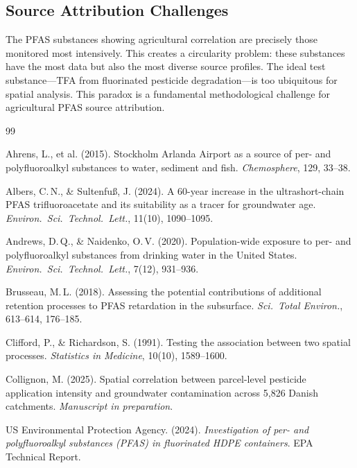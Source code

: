 \documentclass[12pt,a4paper]{article}
\begin{document}
\subsection{Source Attribution Challenges}

The PFAS substances showing agricultural correlation are precisely those monitored most intensively. This creates a circularity problem: these substances have the most data but also the most diverse source profiles. The ideal test substance---TFA from fluorinated pesticide degradation---is too ubiquitous for spatial analysis. This paradox is a fundamental methodological challenge for agricultural PFAS source attribution.

\begin{thebibliography}{99}

 Ahrens, L., et al. (2015). Stockholm Arlanda Airport as a source of per- and polyfluoroalkyl substances to water, sediment and fish. \textit{Chemosphere}, 129, 33--38.

 Albers, C.\,N., \& Sultenfu\ss, J. (2024). A 60-year increase in the ultrashort-chain PFAS trifluoroacetate and its suitability as a tracer for groundwater age. \textit{Environ.\ Sci.\ Technol.\ Lett.}, 11(10), 1090--1095.

 Andrews, D.\,Q., \& Naidenko, O.\,V. (2020). Population-wide exposure to per- and polyfluoroalkyl substances from drinking water in the United States. \textit{Environ.\ Sci.\ Technol.\ Lett.}, 7(12), 931--936.

 Brusseau, M.\,L. (2018). Assessing the potential contributions of additional retention processes to PFAS retardation in the subsurface. \textit{Sci.\ Total Environ.}, 613--614, 176--185.

 Clifford, P., \& Richardson, S. (1991). Testing the association between two spatial processes. \textit{Statistics in Medicine}, 10(10), 1589--1600.

 Collignon, M. (2025). Spatial correlation between parcel-level pesticide application intensity and groundwater contamination across 5,826 Danish catchments. \textit{Manuscript in preparation}.

 US Environmental Protection Agency. (2024). \textit{Investigation of per- and polyfluoroalkyl substances (PFAS) in fluorinated HDPE containers}. EPA Technical Report.


\end{thebibliography}
\end{document}
